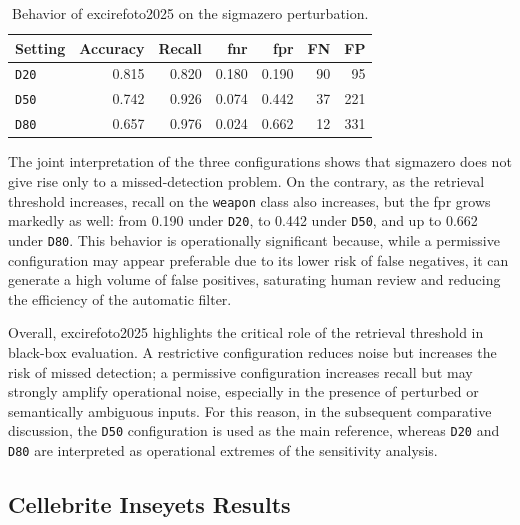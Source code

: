 \begin{table}[H]
\centering
\caption{Behavior of \gls{excirefoto2025} on the \gls{sigmazero} perturbation.}
\label{tab:results-excire-sigma-zero}
\small
\begin{tabular}{l r r r r r r}
\toprule
\textbf{Setting} &
\textbf{Accuracy} &
\textbf{Recall} &
\textbf{\gls{fnr}} &
\textbf{\gls{fpr}} &
\textbf{FN} &
\textbf{FP} \\
\midrule

\texttt{D20} & 0.815 & 0.820 & 0.180 & 0.190 & 90 & 95 \\
\texttt{D50} & 0.742 & 0.926 & 0.074 & 0.442 & 37 & 221 \\
\texttt{D80} & 0.657 & 0.976 & 0.024 & 0.662 & 12 & 331 \\

\bottomrule
\end{tabular}
\end{table}

The joint interpretation of the three configurations shows that
\gls{sigmazero} does not give rise only to a missed-detection problem. On the
contrary, as the retrieval threshold increases, recall on the \texttt{weapon}
class also increases, but the \gls{fpr} grows markedly as well: from 0.190 under
\texttt{D20}, to 0.442 under \texttt{D50}, and up to 0.662 under \texttt{D80}.
This behavior is operationally significant because, while a permissive
configuration may appear preferable due to its lower risk of false negatives,
it can generate a high volume of false positives, saturating human review and
reducing the efficiency of the automatic filter.

Overall, \gls{excirefoto2025} highlights the critical role of the retrieval
threshold in black-box evaluation. A restrictive configuration reduces noise but
increases the risk of missed detection; a permissive configuration increases
recall but may strongly amplify operational noise, especially in the presence
of perturbed or semantically ambiguous inputs. For this reason, in the
subsequent comparative discussion, the \texttt{D50} configuration is used as
the main reference, whereas \texttt{D20} and \texttt{D80} are interpreted as
operational extremes of the sensitivity analysis.

\subsection{Cellebrite Inseyets Results}
\label{subsec:results-cellebrite}

